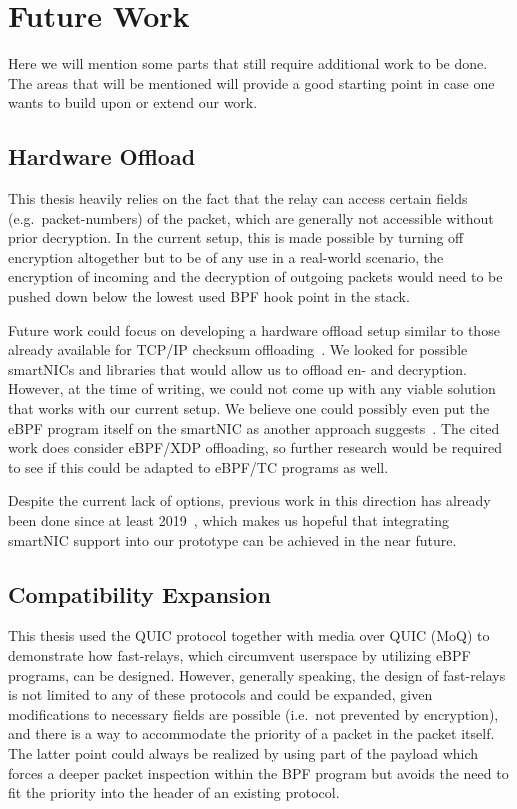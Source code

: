 \section{Future Work}\label{sec:future_work}

Here we will mention some parts that still require additional work 
to be done.
The areas that will be mentioned will provide a good starting point
in case one wants to build upon or extend our work.

\subsection{Hardware Offload}
This thesis heavily relies on the fact that the relay can
access certain fields (e.g.~packet-numbers) of the packet, 
which are generally not accessible without prior decryption.
In the current setup, this is made possible by turning off 
encryption altogether but to be of any use in a real-world
scenario, the encryption of incoming and the decryption of
outgoing packets would need to be pushed down below the lowest 
used BPF hook point in the stack.

Future work could focus on developing a hardware offload 
setup similar to those already available for TCP/IP checksum 
offloading~\parencite{tcp-ip-offload-engine}.
We looked for possible smartNICs and libraries that would allow us
to offload en- and decryption.
However, at the time of writing, we could not come up with any viable solution
that works with our current setup. 
We believe one could possibly even put the eBPF program itself on the smartNIC as 
another approach suggests~\parencite{ebpf-offload-smartnics}.
The cited work does consider eBPF/XDP offloading, so further 
research would be required to see if this could be adapted to eBPF/TC 
programs as well.

Despite the current lack of options, previous work in this direction has already been 
done since at least 2019~\parencite{quic-nic-offload}, which makes us hopeful that
integrating smartNIC support into our prototype can be achieved in the near future.

\subsection{Compatibility Expansion}\label{sec:compatibility_expansion}
This thesis used the QUIC protocol together with media over QUIC (MoQ)
to demonstrate how fast-relays, which circumvent userspace by utilizing eBPF programs, can be designed.
However, generally speaking, the design of fast-relays is not limited to
any of these protocols and could be expanded, given modifications to 
necessary fields are possible (i.e.~not prevented by encryption), and
there is a way to accommodate the priority of a packet in the packet itself.
The latter point could always be realized by using part of the payload
which forces a deeper packet inspection within the BPF program but 
avoids the need to fit the priority into the header of an existing 
protocol.


